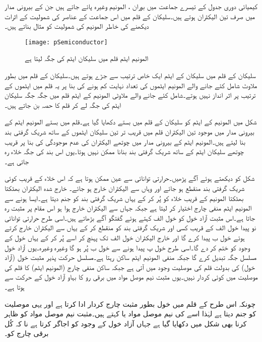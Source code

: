 کیمیائی دوری جدول کے تیسرے جماعت میں بوران ، المونیم   وغیرہ پائے جاتے ہیں جن کے بیرونی مدار میں صرف تین الیکٹران ہوتے ہیں۔سلیکان کے قلم میں اس جماعت کے عناصر کی شمولیت کے اثرات دیکھنے کی خاطر المونیم کی شمولیت کو مثال بناتے ہیں۔
\begin{figure}
\centering
\texttt{[image: pSemiconductor]}
\caption{ المونیم ایٹم قلم میں سلیکان ایٹم کی جگہ لیتا ہے}
\label{شکل_مثبت_نیم_موصل}
\end{figure}
سلیکان کے قلم میں سلیکان کے ایٹم ایک خاص ترتیب سے جڑے ہوتے ہیں۔سلیکان کے قلم میں بطور ملاوٹ شامل کئے جانے والے المونیم ایٹموں کی تعداد نہایت کم ہونے کی بنا پر یہ قلم میں ایٹموں کے ترتیب پر اثر انداز نہیں ہوتے۔شامل کئے جانے والے ملاوٹی المونیم کے ایٹم قلم میں جگہ جگہ سلیکان ایٹم کی جگہ لے کر  قلم  کا حصہ بن جاتے ہیں۔

شکل   میں المونیم کے ایٹم کو سلیکان کے قلم میں بستے دکھایا گیا ہے۔قلم میں بستے المونیم ایٹم کے بیرونی مدار میں موجود تین الیکٹران قلم میں قریب تر تین سلیکان ایٹموں کے ساتھ شریک گرفتی بند بنا لیتے ہیں۔المونیم ایٹم کے بیرونی مدار میں چوتھے الیکٹران کی عدم موجودگی کی بنا پر قریب چوتھے سلیکان ایٹم کے ساتھ شریک گرفتی بند بنانا ممکن نہیں ہوتا۔یوں اس بند کی جگہ خلاء رہ جاتی ہے۔

شکل   کو دیکھتے ہوئے آگے پڑھیں۔حرارتی توانائی سے عین ممکن ہوتا ہے کہ اس خلاء کے قریب کوئی شریک گرفتی بند منقطع ہو جائے اور وہاں سے الیکٹران خارج ہو جائے۔ خارج شدہ الیکٹران بھٹکتا بھٹکتا المونیم کے قریب خلاء کو پُر کر کے  یہاں شریک گرفتی بند کو جنم دیتا ہے۔ایسا ہونے سے المونیم ایٹم منفی چارج اختیار کر لیتا ہے جبکہ جہاں سے الیکٹران خارج ہوا ہو اس مقام پر مثبت   رہ جاتا ہے۔اس مثبت آزاد خول کو خول  الف کہتے ہوئے گفتگو آگے بڑھاتے ہیں۔اسی طرح حرارتی توانائی نو پیدا خول  الف کے قریب کسی اور شریک گرفتی بند کو منقطع کر کے یہاں سے الیکٹران خارج کرتے ہوئے خول  ب پیدا کرے گا اور خارج الیکٹران خول  الف تک پہنچ کر اسے پُر کر کے یہاں خول کے وجود کو ختم کر دے گا۔اسی طرح خول  پ پیدا ہونے سے خول  ب پُر ہو گا وغیرہ وغیرہ۔یوں آزاد خول مسلسل جگہ تبدیل کرے گا جبکہ منفی المونیم ایٹم ساکن رہتا ہے۔مسلسل حرکت پذیر مثبت خول  (آزاد خول) کی بدولت قلم کی موصلیت وجود میں آتی ہے جبکہ ساکن منفی چارج (المونیم ایٹم) کا قلم کی موصلیت میں کوئی کردار نہیں۔یوں مثبت نیم موصل مواد میں برقی رو کا بہاو آزاد خول کے حرکت سے ہوتا ہے۔ 

چونکہ اس طرح کے قلم میں خول 	بطور مثبت چارج کردار ادا کرتا ہے اور یہی موصلیت کو جنم دیتا ہے لہٰذا اسے  کی نیم موصل مواد یا   کہتے ہیں۔مثبت نیم موصل مواد کو ظاہر کرنا بھی شکل   میں دکھایا گیا ہے جہاں  آزاد خول کے وجود کو اجاگر کرتا ہے نا کہ کُل برقی چارج کو۔

